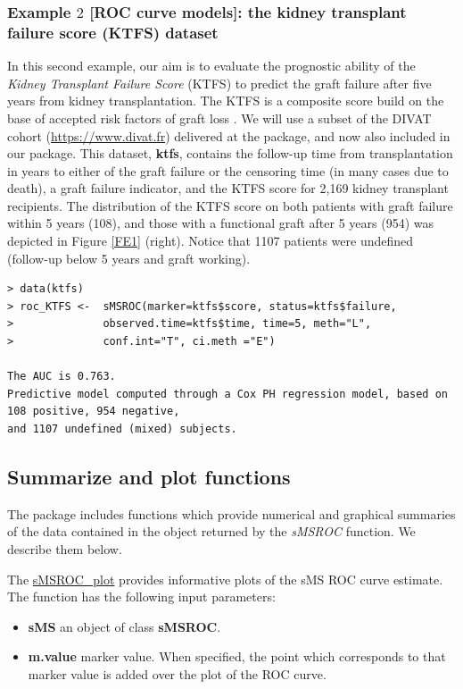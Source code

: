 \subsubsection{Example $2$ [ROC curve models]: the kidney transplant failure score (KTFS) dataset}
In this second example, our aim is to evaluate the prognostic ability of the {\textit{Kidney Transplant Failure Score}} (KTFS) to predict the graft failure after five years from kidney transplantation. The KTFS is a composite score build on the base of accepted risk factors of graft loss \citep{Foucher2010}. We will use a subset of the DIVAT cohort (\url{https://www.divat.fr}) delivered at the  package, and now also included in our package. This dataset, {\bf{ktfs}}, contains the follow-up time from transplantation in years to either of the graft failure or the censoring time (in many cases due to death), a graft failure indicator, and the KTFS score for 2,169 kidney transplant recipients. The distribution of the KTFS score on both patients with graft failure within 5 years (108), and those with a functional graft after 5 years (954) was depicted in Figure \ref{FE1} (right). Notice that 1107 patients were undefined (follow-up below 5 years and graft working).

\begin{verbatim}
> data(ktfs)
> roc_KTFS <-  sMSROC(marker=ktfs$score, status=ktfs$failure,
>              observed.time=ktfs$time, time=5, meth="L",
>              conf.int="T", ci.meth ="E")  

The AUC is 0.763. 
Predictive model computed through a Cox PH regression model, based on 108 positive, 954 negative, 
and 1107 undefined (mixed) subjects.
\end{verbatim}

\subsection{Summarize and plot functions}
The  package includes functions which provide numerical and graphical summaries of the data contained in the object returned by the {\textit{sMSROC}} function. We describe them below.  

The \url{sMSROC\_plot} provides informative plots of the sMS ROC curve estimate. The function has the following input parameters:

\begin{itemize}
\item{\textbf{sMS}} {an object of class {\textbf{sMSROC}}.} 
\item{\textbf{m.value}} {marker value. When specified, the point which corresponds to that marker value is added over the plot of the ROC curve.}
\end{itemize}

